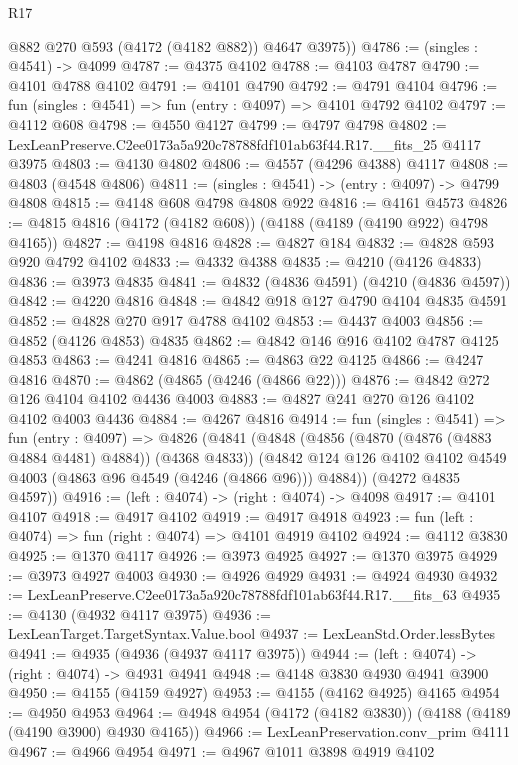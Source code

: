\begin{lexlean}{R17}
\begin{coremodule}
        @882
        @270
        @593
        (@4172 (@4182 @882))
        @4647
        @3975))
@4786 := (singles : @4541) -> @4099
@4787 := @4375 @4102
@4788 := @4103 @4787
@4790 := @4101 @4788 @4102
@4791 := @4101 @4790
@4792 := @4791 @4104
@4796 := fun (singles : @4541) => fun (entry : @4097) => @4101 @4792 @4102
@4797 := @4112 @608
@4798 := @4550 @4127
@4799 := @4797 @4798
@4802 := LexLeanPreserve.C2ee0173a5a920c78788fdf101ab63f44.R17.__fits_25 @4117 @3975
@4803 := @4130 @4802
@4806 := @4557 (@4296 @4388) @4117
@4808 := @4803 (@4548 @4806)
@4811 := (singles : @4541) -> (entry : @4097) -> @4799 @4808
@4815 := @4148 @608 @4798 @4808 @922
@4816 := @4161 @4573
@4826 := @4815 @4816 (@4172 (@4182 @608)) (@4188 (@4189 (@4190 @922) @4798 @4165))
@4827 := @4198 @4816
@4828 := @4827 @184
@4832 := @4828 @593 @920 @4792 @4102
@4833 := @4332 @4388
@4835 := @4210 (@4126 @4833)
@4836 := @3973 @4835
@4841 := @4832 (@4836 @4591) (@4210 (@4836 @4597))
@4842 := @4220 @4816
@4848 := @4842 @918 @127 @4790 @4104 @4835 @4591
@4852 := @4828 @270 @917 @4788 @4102
@4853 := @4437 @4003
@4856 := @4852 (@4126 @4853) @4835
@4862 := @4842 @146 @916 @4102 @4787 @4125 @4853
@4863 := @4241 @4816
@4865 := @4863 @22 @4125
@4866 := @4247 @4816
@4870 := @4862 (@4865 (@4246 (@4866 @22)))
@4876 := @4842 @272 @126 @4104 @4102 @4436 @4003
@4883 := @4827 @241 @270 @126 @4102 @4102 @4003 @4436
@4884 := @4267 @4816
@4914 := fun (singles : @4541) =>
  fun (entry : @4097) =>
  @4826
    (@4841
      (@4848
        (@4856 (@4870 (@4876 (@4883 @4884 @4481) @4884)) (@4368 @4833))
        (@4842 @124 @126 @4102 @4102 @4549 @4003 (@4863 @96 @4549 (@4246 (@4866 @96))) @4884))
      (@4272 @4835 @4597))
@4916 := (left : @4074) -> (right : @4074) -> @4098
@4917 := @4101 @4107
@4918 := @4917 @4102
@4919 := @4917 @4918
@4923 := fun (left : @4074) => fun (right : @4074) => @4101 @4919 @4102
@4924 := @4112 @3830
@4925 := @1370 @4117
@4926 := @3973 @4925
@4927 := @1370 @3975
@4929 := @3973 @4927 @4003
@4930 := @4926 @4929
@4931 := @4924 @4930
@4932 := LexLeanPreserve.C2ee0173a5a920c78788fdf101ab63f44.R17.__fits_63
@4935 := @4130 (@4932 @4117 @3975)
@4936 := LexLeanTarget.TargetSyntax.Value.bool
@4937 := LexLeanStd.Order.lessBytes
@4941 := @4935 (@4936 (@4937 @4117 @3975))
@4944 := (left : @4074) -> (right : @4074) -> @4931 @4941
@4948 := @4148 @3830 @4930 @4941 @3900
@4950 := @4155 (@4159 @4927)
@4953 := @4155 (@4162 @4925) @4165
@4954 := @4950 @4953
@4964 := @4948 @4954 (@4172 (@4182 @3830)) (@4188 (@4189 (@4190 @3900) @4930 @4165))
@4966 := LexLeanPreservation.conv_prim @4111
@4967 := @4966 @4954
@4971 := @4967 @1011 @3898 @4919 @4102

\end{coremodule}
\end{lexlean}
